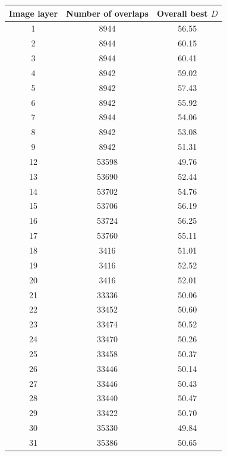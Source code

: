 \documentclass[letterpaper,11pt]{article}
\begin{document}
\begin{table}[!htb]
\centering
\begin{tabular}{c c c}
Image layer & Number of overlaps & Overall best $D$ \\
\hline
1           & 8944               & 56.55 \\
2           & 8944               & 60.15 \\
3           & 8944               & 60.41 \\
4           & 8942               & 59.02 \\
5           & 8942               & 57.43 \\
6           & 8942               & 55.92 \\
7           & 8944               & 54.06 \\
8           & 8942               & 53.08 \\
9           & 8942               & 51.31 \\
12          & 53598              & 49.76 \\
13          & 53690              & 52.44 \\
14          & 53702              & 54.76 \\
15          & 53706              & 56.19 \\
16          & 53724              & 56.25 \\
17          & 53760              & 55.11 \\
18          & 3416               & 51.01 \\
19          & 3416               & 52.52 \\
20          & 3416               & 52.01 \\
21          & 33336              & 50.06 \\
22          & 33452              & 50.60 \\
23          & 33474              & 50.52 \\
24          & 33470              & 50.26 \\
25          & 33458              & 50.37 \\
26          & 33446              & 50.14 \\
27          & 33446              & 50.43 \\
28          & 33440              & 50.47 \\
29          & 33422              & 50.70 \\
30          & 35330              & 49.84 \\
31          & 35386              & 50.65 \\

\end{tabular}
\end{table}
\end{document}
